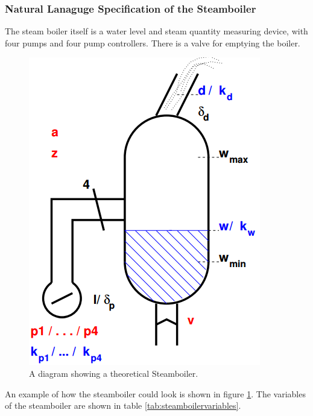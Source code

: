 \subsubsection{Natural Lanaguge Specification of the Steamboiler}

The steam boiler itself is a water level and steam quantity measuring device,
with four pumps and four pump controllers. There is a valve for emptying the
boiler.

\begin{figure}[H]
\centering
\includegraphics[scale=0.5]{Figures/Evaluation/steamboilerimage.png}
\caption{A diagram showing a theoretical Steamboiler. \label{fig:steamboiler}}
\end{figure}

An example of how the steamboiler could look is shown in figure
\ref{fig:steamboiler}. The variables of the steamboiler are shown in table
\ref{tab:steamboilervariables}.

